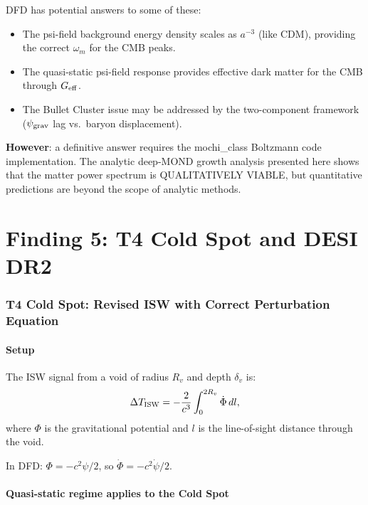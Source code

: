 \documentclass[11pt]{article}
\newcommand{\Geff}{G_{\rm eff}}
\begin{document}
DFD has potential answers to some of these:
\begin{itemize}
\item The psi-field background energy density scales as $a^{-3}$ (like CDM),
  providing the correct $\omega_m$ for the CMB peaks.
\item The quasi-static psi-field response provides effective dark matter
  for the CMB through $\Geff$.
\item The Bullet Cluster issue may be addressed by the two-component
  framework ($\psi_{\rm grav}$ lag vs.\ baryon displacement).
\end{itemize}

\textbf{However}: a definitive answer requires the mochi\_class Boltzmann
code implementation. The analytic deep-MOND growth analysis presented
here shows that the matter power spectrum is QUALITATIVELY VIABLE,
but quantitative predictions are beyond the scope of analytic methods.


\part{Finding 5: T4 Cold Spot and DESI DR2}
\label{part:T4-DESI}

\section{T4 Cold Spot: Revised ISW with Correct Perturbation Equation}

\subsection{Setup}

The ISW signal from a void of radius $R_v$ and depth $\delta_v$ is:
\begin{equation}
\Delta T_{\rm ISW} = -\frac{2}{c^3}\int_0^{2R_v}\dot\Phi\,dl,
\end{equation}
where $\Phi$ is the gravitational potential and $l$ is the line-of-sight
distance through the void.

In DFD: $\Phi = -c^2\psi/2$, so $\dot\Phi = -c^2\dot\psi/2$.

\subsection{Quasi-static regime applies to the Cold Spot}
\end{document}

